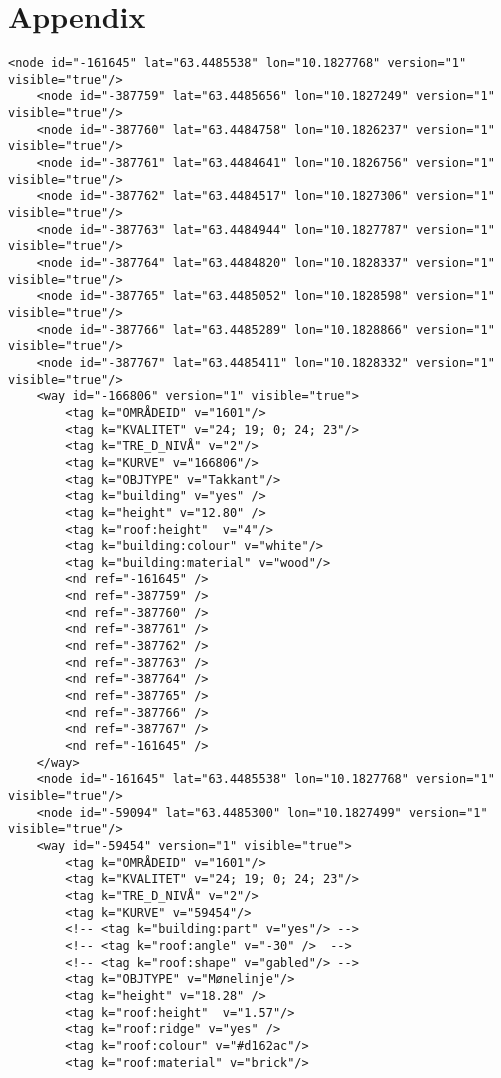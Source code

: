 \chapter{Appendix}

\begin{lstlisting}
<node id="-161645" lat="63.4485538" lon="10.1827768" version="1" visible="true"/>
	<node id="-387759" lat="63.4485656" lon="10.1827249" version="1" visible="true"/>
	<node id="-387760" lat="63.4484758" lon="10.1826237" version="1" visible="true"/>
	<node id="-387761" lat="63.4484641" lon="10.1826756" version="1" visible="true"/>
	<node id="-387762" lat="63.4484517" lon="10.1827306" version="1" visible="true"/>
	<node id="-387763" lat="63.4484944" lon="10.1827787" version="1" visible="true"/>
	<node id="-387764" lat="63.4484820" lon="10.1828337" version="1" visible="true"/>
	<node id="-387765" lat="63.4485052" lon="10.1828598" version="1" visible="true"/>
	<node id="-387766" lat="63.4485289" lon="10.1828866" version="1" visible="true"/>
	<node id="-387767" lat="63.4485411" lon="10.1828332" version="1" visible="true"/>
	<way id="-166806" version="1" visible="true">
		<tag k="OMRÅDEID" v="1601"/>
		<tag k="KVALITET" v="24; 19; 0; 24; 23"/>
		<tag k="TRE_D_NIVÅ" v="2"/>
		<tag k="KURVE" v="166806"/>
		<tag k="OBJTYPE" v="Takkant"/>
		<tag k="building" v="yes" />
		<tag k="height" v="12.80" />
		<tag k="roof:height"  v="4"/>
		<tag k="building:colour" v="white"/>
  		<tag k="building:material" v="wood"/>
		<nd ref="-161645" />
		<nd ref="-387759" />
		<nd ref="-387760" />
		<nd ref="-387761" />
		<nd ref="-387762" />
		<nd ref="-387763" />
		<nd ref="-387764" />
		<nd ref="-387765" />
		<nd ref="-387766" />
		<nd ref="-387767" />
		<nd ref="-161645" />
	</way>
	<node id="-161645" lat="63.4485538" lon="10.1827768" version="1" visible="true"/>
	<node id="-59094" lat="63.4485300" lon="10.1827499" version="1" visible="true"/>
	<way id="-59454" version="1" visible="true">
		<tag k="OMRÅDEID" v="1601"/>
		<tag k="KVALITET" v="24; 19; 0; 24; 23"/>
		<tag k="TRE_D_NIVÅ" v="2"/>
		<tag k="KURVE" v="59454"/>
		<!-- <tag k="building:part" v="yes"/> -->
		<!-- <tag k="roof:angle" v="-30" />  -->
		<!-- <tag k="roof:shape" v="gabled"/> -->
		<tag k="OBJTYPE" v="Mønelinje"/>
		<tag k="height" v="18.28" />
		<tag k="roof:height"  v="1.57"/>
		<tag k="roof:ridge" v="yes" />
		<tag k="roof:colour" v="#d162ac"/>
		<tag k="roof:material" v="brick"/>

\end{lstlisting}
